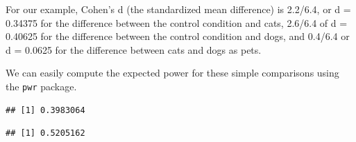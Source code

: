 \documentclass[
]{book}
\newenvironment{Shaded}{\begin{snugshade}}{\end{snugshade}}
\newcommand{\AttributeTok}[1]{\textcolor[rgb]{0.77,0.63,0.00}{#1}}
\newcommand{\DecValTok}[1]{\textcolor[rgb]{0.00,0.00,0.81}{#1}}
\newcommand{\FloatTok}[1]{\textcolor[rgb]{0.00,0.00,0.81}{#1}}
\newcommand{\FunctionTok}[1]{\textcolor[rgb]{0.00,0.00,0.00}{#1}}
\newcommand{\NormalTok}[1]{#1}
\newcommand{\SpecialCharTok}[1]{\textcolor[rgb]{0.00,0.00,0.00}{#1}}
\newcommand{\StringTok}[1]{\textcolor[rgb]{0.31,0.60,0.02}{#1}}
\begin{document}
For our example, Cohen's d (the standardized mean difference) is 2.2/6.4, or d = 0.34375 for the difference between the control condition and cats, 2.6/6.4 of d = 0.40625 for the difference between the control condition and dogs, and 0.4/6.4 or d = 0.0625 for the difference between cats and dogs as pets.

We can easily compute the expected power for these simple comparisons using the \texttt{pwr} package.

\begin{Shaded}
\end{Shaded}

\begin{verbatim}
## [1] 0.3983064
\end{verbatim}

\begin{Shaded}
\end{Shaded}

\begin{verbatim}
## [1] 0.5205162
\end{verbatim}

\begin{Shaded}
\end{Shaded}
\end{document}
